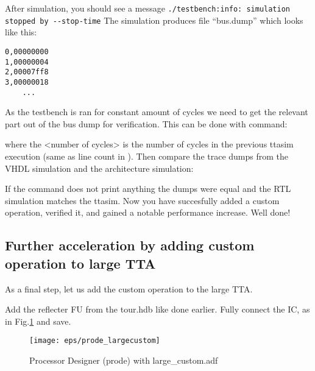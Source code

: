 \documentclass[twoside]{tceusermanual}
\begin{document}
After simulation, you should see a message
\verb|./testbench:info: simulation stopped by --stop-time|
The simulation produces file ``bus.dump'' which looks like this:
\begin{verbatim}
0,00000000
1,00000004
2,00007ff8
3,00000018
    ...
\end{verbatim}


As the testbench is ran for constant amount of cycles we
need to get the relevant part out of the bus dump for
verification. This can be done with command:


where the <number of cycles> is the number of cycles in the previous
ttasim execution (same as line count in ).
Then compare the trace dumps from the VHDL simulation and the architecture simulation:


If the command does not print anything the dumps were equal and the RTL
simulation matches the ttasim. Now you have succesfully added a custom
operation, verified it, and gained a notable performance increase. Well
done!


\subsection{Further acceleration by adding custom operation to large TTA}
\label{ssec:large_custom}

As a final step, let us add the custom operation to the large TTA.



%

Add the reflecter FU from the tour.hdb like done earlier. Fully
connect the IC, as in Fig.\ref{fig:prode_largecustom} and save.

\begin{figure}
  \begin{center}
    \texttt{[image: eps/prode\_largecustom]}
    \caption{Processor Designer (prode) with large\_custom.adf}
    \label{fig:prode_largecustom}
  \end{center}
\end{figure}
\end{document}
